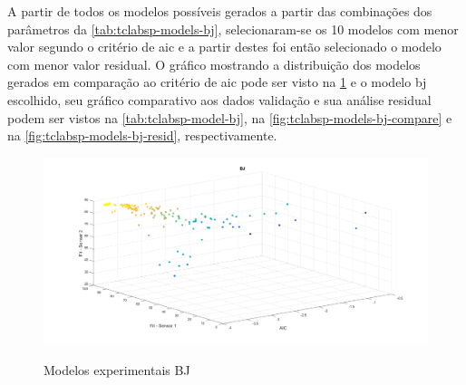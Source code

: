 A partir de todos os modelos possíveis gerados a partir das combinações dos parâmetros da \cref{tab:tclabsp-models-bj},
selecionaram-se os 10 modelos com menor valor segundo o critério de \acrshort{aic} e a partir destes foi então
selecionado o modelo com menor valor residual.
O gráfico mostrando a distribuição dos modelos gerados em comparação ao critério de \acrshort{aic} pode ser
visto na \cref{fig:tclabsp-models-bj} e o modelo \acrshort{bj} escolhido, seu gráfico comparativo aos dados validação
e sua análise residual podem ser vistos na \cref{tab:tclabsp-model-bj}, na \cref{fig:tclabsp-models-bj-compare} e na
\cref{fig:tclabsp-models-bj-resid}, respectivamente.

\begin{figure}[h]
	\caption{Modelos experimentais BJ}
	\begin{center}
		\includegraphics[width=1.00\textwidth]{./5_images/tclabsp-models-BJ.png} 
		\label{fig:tclabsp-models-bj}
	\end{center}
	\centering
\end{figure}

